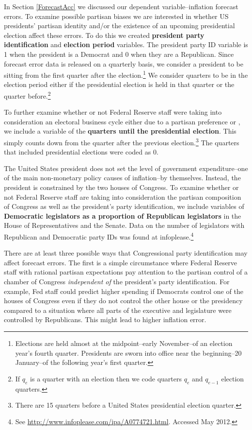 \documentclass[a4paper]{article}\usepackage{graphicx, color}
\begin{document}
In Section \ref{ForecastAcc} we discussed our dependent variable--inflation forecast errors. To examine possible partisan biases we are interested in whether US presidents' partisan identity and/or the existence of an upcoming presidential election affect these errors. To do this we created {\bf{president party identification}} and {\bf{election period}} variables. The president party ID variable is 1 when the president is a Democrat and 0 when they are a Republican. Since forecast error data is released on a quarterly basis, we consider a president to be sitting from the first quarter after the election.\footnote{Elections are held almost at the midpoint--early November--of an election year's fourth quarter. Presidents are sworn into office near the beginning--20 January--of the following year's first quarter.} We consider quarters to be in the election period either if the presidential election is held in that quarter or the quarter before.\footnote{If $q_{e}$ is a quarter with an election then we code quarters $q_{e}$ and $q_{e-1}$ election quarters.}

To further examine whether or not Federal Reserve staff were taking into consideration an electoral business cycle either due to a partisan preference or , we include a variable of the {\bf{quarters until the presidential election}}. This simply counts down from the quarter after the previous election.\footnote{There are 15 quarters before a United States presidential election quarter.} The quarters that included presidential elections were coded as 0. 

The United States president does not set the level of government expenditure--one of the main non-monetary policy causes of inflation--by themselves. Instead, the president is constrained by the two houses of Congress. To examine whether or not Federal Reserve staff are taking into consideration the partisan composition of Congress as well as the president's party identification, we include variables of {\bf{Democratic legislators as a proportion of Republican legislators}} in the House of Representatives and the Senate. Data on the number of legislators with Republican and Democratic party IDs was found at infoplease.\footnote{See {\url{http://www.infoplease.com/ipa/A0774721.html}}. Accessed May 2012.} 

There are at least three possible ways that Congressional party identification may affect forecast errors. The first is a simple circumstance where Federal Reserve staff with rational partisan expectations pay attention to the partisan control of a chamber of Congress {\emph{independent of}} the president's party identification.  For example, Fed staff could predict higher spending if Democrats control one of the houses of Congress even if they do not control the other house or the presidency compared to a situation where all parts of the executive and legislature were controlled by Republicans. This might lead to higher inflation error.
\end{document}
